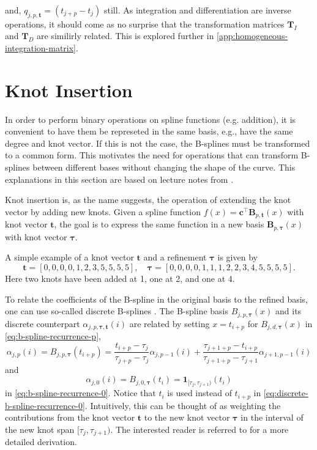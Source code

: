 and, $q_{j,p,\mathbf{t}} = (t_{j+p}-t_j)$ still.
As integration and differentiation are inverse operations, it should come as no surprise that the transformation matrices $\mathbf T_I$ and $\mathbf T_D$ are similirly related. This is explored further in \cref{app:homogeneous-integration-matrix}.


\section{Knot Insertion}
In order to perform binary operations on spline functions (e.g. addition), it is convenient to have them be represeted in the same basis, e.g., have the same degree and knot vector. If this is not the case, the B-splines must be transformed to a common form. This motivates the need for operations that can transform B-splines between different bases without changing the shape of the curve. This explanations in this section are based on lecture notes from \cite{bspline-uio}.

Knot insertion is, as the name suggests, the operation of extending the knot vector by adding new knots. Given a spline function $f(x) = \mathbf{c}^{\top} \mathbf{B}_{p, \mathbf{t}}(x)$ with knot vector $\mathbf t$, the goal is to express the same function in a new basis $\mathbf{B}_{p, \boldsymbol{\tau}}(x)$ with knot vector $\boldsymbol{\tau}$.

A simple example of a knot vector $\mathbf t$ and a refinement $\boldsymbol \tau$ is given by
$$
    \mathbf t = [0, 0, 0, 0, 1, 2, 3, 5, 5, 5, 5], \quad \boldsymbol \tau = [0, 0, 0, 0, 1, 1, 1, 2, 2, 3, 4, 5, 5, 5, 5].
$$
Here two knots have been added at 1, one at 2, and one at 4.

To relate the coefficients of the B-spline in the original basis to the refined basis, one can use so-called discrete B-splines \citep{Cohen1980}.  The B-spline basis $B_{j, p, \boldsymbol{\tau}}(x)$ and its discrete counterpart $\alpha_{j,p, \boldsymbol{\tau}, \mathbf t}(i)$ are related by setting $x = t_{i+p}$ for $B_{j, d, \boldsymbol{\tau}}(x)$ in \cref{eq:b-spline-recurrence-p}, 
\begin{equation}\label{eq:discrete-b-spline-recurrence-p}
    \alpha_{j,p}(i) = B_{j, p, \boldsymbol{\tau}}(t_{i+p}) = 
    \frac{t_{i+p}-\tau_j}{\tau_{j+p}-\tau_j} \alpha_{j,p-1}(i) + \frac{\tau_{j+1+p}-t_{i+p}}{\tau_{j+1+p}-\tau_{j+1}} \alpha_{j+1,p-1}(i)
\end{equation}
and 
\begin{equation}\label{eq:discrete-b-spline-recurrence-0}
\alpha_{j,0}(i) = B_{j, 0, \boldsymbol{\tau}}(t_{i}) = \mathbf 1_{[\tau_j, \tau_{j+1})}(t_{i})
\end{equation}
 in \cref{eq:b-spline-recurrence-0}. Notice that $t_i$ is used instead of $t_{i+p}$ in \cref{eq:discrete-b-spline-recurrence-0}. Intuitively, this can be thought of as weighting the contributions from the knot vector $\mathbf t$ to the new knot vector $\boldsymbol \tau$ in the interval of the new knot span $[\tau_j, \tau_{j+1})$. The interested reader is referred to \cite{bspline-uio} for a more detailed derivation.

